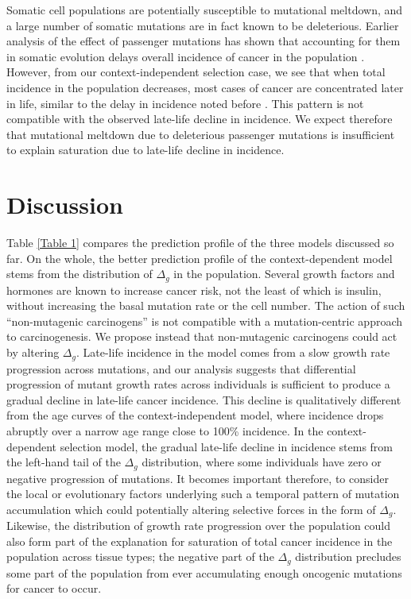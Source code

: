 \documentclass[12pt,onecolumn,twoside]{article}
\begin{document}
Somatic cell populations are potentially susceptible to mutational meltdown, and a large number of somatic mutations are in fact known to be deleterious. Earlier analysis of the effect of passenger mutations has shown that accounting for them in somatic evolution delays overall incidence of cancer in the population \autocite{McFarland2013}. However, from our context-independent selection case, we see that when total incidence in the population decreases, most cases of cancer are concentrated later in life, similar to the delay in incidence noted before \autocite{McFarland2013}. This pattern is not compatible with the observed late-life decline in incidence. We expect therefore that mutational meltdown due to deleterious passenger mutations is insufficient to explain saturation due to late-life decline in incidence.

\section{Discussion}

Table \ref{Table 1} compares the prediction profile of the three models discussed so far. On the whole, the better prediction profile of the context-dependent model stems from the distribution of $\Delta_{g}$ in the population. Several growth factors and hormones are known to increase cancer risk, not the least of which is insulin, without increasing the basal mutation rate or the cell number. The action of such ``non-mutagenic carcinogens'' is not compatible with a mutation-centric approach to carcinogenesis. We propose instead that non-mutagenic carcinogens could act by altering $\Delta_{g}$.
Late-life incidence in the model comes from a slow growth rate progression across mutations, and our analysis suggests that differential progression of mutant growth rates across individuals is sufficient to produce a gradual decline in late-life cancer incidence. This decline is qualitatively different from the age curves of the context-independent model, where incidence drops abruptly over a narrow age range close to 100\% incidence. In the context-dependent selection model, the gradual late-life decline in incidence stems from the left-hand tail of the $\Delta_{g}$ distribution, where some individuals have zero or negative progression of mutations. It becomes important therefore, to consider the local or evolutionary factors underlying such a temporal pattern of mutation accumulation which could potentially altering selective forces in the form of $\Delta_{g}$. Likewise, the distribution of growth rate progression over the population could also form part of the explanation for saturation of total cancer incidence in the population across tissue types; the negative part of the $\Delta_{g}$ distribution precludes some part of the population from ever accumulating enough oncogenic mutations for cancer to occur.
\end{document}
